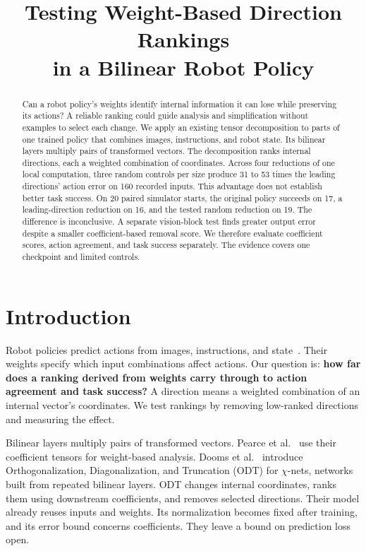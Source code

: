\documentclass{article}
\title{Testing Weight-Based Direction Rankings\\in a Bilinear Robot Policy}
\author{}
\date{}
\begin{document}
\maketitle

\begin{abstract}
Can a robot policy's weights identify internal information it can lose while preserving its actions? A reliable ranking could guide analysis and simplification without examples to select each change. We apply an existing tensor decomposition to parts of one trained policy that combines images, instructions, and robot state. Its bilinear layers multiply pairs of transformed vectors. The decomposition ranks internal directions, each a weighted combination of coordinates. Across four reductions of one local computation, three random controls per size produce 31 to 53 times the leading directions' action error on 160 recorded inputs. This advantage does not establish better task success. On 20 paired simulator starts, the original policy succeeds on 17, a leading-direction reduction on 16, and the tested random reduction on 19. The difference is inconclusive. A separate vision-block test finds greater output error despite a smaller coefficient-based removal score. We therefore evaluate coefficient scores, action agreement, and task success separately. The evidence covers one checkpoint and limited controls.
\end{abstract}

\section{Introduction}

Robot policies predict actions from images, instructions, and state~\citep{kim2024}. Their weights specify which input combinations affect actions. Our question is: \textbf{how far does a ranking derived from weights carry through to action agreement and task success?} A direction means a weighted combination of an internal vector's coordinates. We test rankings by removing low-ranked directions and measuring the effect.

Bilinear layers multiply pairs of transformed vectors. Pearce et al.~\citep{pearce2025} use their coefficient tensors for weight-based analysis. Dooms et al.~\citep{dooms2025} introduce Orthogonalization, Diagonalization, and Truncation (ODT) for $\chi$-nets, networks built from repeated bilinear layers. ODT changes internal coordinates, ranks them using downstream coefficients, and removes selected directions. Their model already reuses inputs and weights. Its normalization becomes fixed after training, and its error bound concerns coefficients. They leave a bound on prediction loss open.
\end{document}
